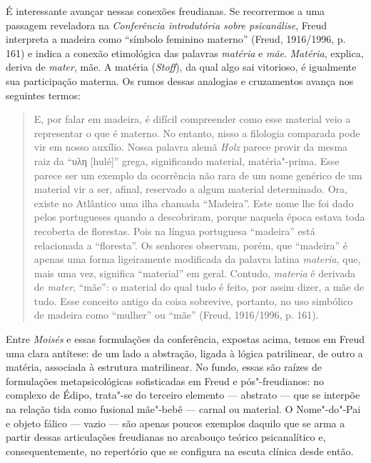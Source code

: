 É interessante avançar nessas conexões freudianas. Se recorrermos a uma
passagem reveladora na \emph{ Conferência introdutória sobre
psicanálise}, Freud interpreta a madeira como ``símbolo feminino
materno'' (Freud, 1916/1996, p. 161) e indica a conexão etimológica das
palavras \emph{matéria} e \emph{mãe}. \emph{Matéria}, explica, deriva de
\emph{mater}, mãe. A matéria (\emph{Stoff}), da qual algo sai vitorioso,
é igualmente sua participação materna. Os rumos dessas analogias e
cruzamentos avança nos seguintes termos:

\begin{quote}
E, por falar em madeira, é difícil compreender como esse material veio a
representar o que é materno. No entanto, nisso a filologia comparada
pode vir em nosso auxílio. Nossa palavra alemã \emph{Holz} parece provir
da mesma raiz da ``υλη {[}hulé{]}'' grega, significando material,
matéria"-prima. Esse parece ser um exemplo da ocorrência não rara de um
nome genérico de um material vir a ser, afinal, reservado a algum
material determinado. Ora, existe no Atlântico uma ilha chamada
``Madeira''. Este nome lhe foi dado pelos portugueses quando a
descobriram, porque naquela época estava toda recoberta de florestas.
Pois na língua portuguesa ``madeira'' está relacionada a ``floresta''.
Os senhores observam, porém, que ``madeira'' é apenas uma forma
ligeiramente modificada da palavra latina \emph{materia}, que, mais uma
vez, significa ``material'' em geral. Contudo, \emph{materia} é derivada
de \emph{mater}, ``mãe'': o material do qual tudo é feito, por assim
dizer, a mãe de tudo. Esse conceito antigo da coisa sobrevive, portanto,
no uso simbólico de madeira como ``mulher'' ou ``mãe'' (Freud,
1916/1996, p. 161).
\end{quote}

Entre \emph{Moisés} e essas formulações da conferência, expostas acima,
temos em Freud uma clara antítese: de um lado a abstração, ligada à
lógica patrilinear, de outro a matéria, associada à estrutura
matrilinear. No fundo, essas são raízes de formulações metapsicológicas
sofisticadas em Freud e pós"-freudianos: no complexo de Édipo, trata"-se
do terceiro elemento --- abstrato --- que se interpõe na relação tida como
fusional mãe"-bebê --- carnal ou material. O Nome"-do"-Pai e objeto fálico
--- vazio --- são apenas poucos exemplos daquilo que se arma a partir
dessas articulações freudianas no arcabouço teórico psicanalítico e,
consequentemente, no repertório que se configura na escuta clínica desde
então.

